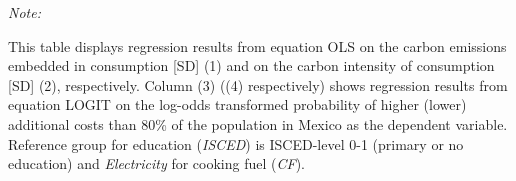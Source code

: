 \begin{table}[htbp!]
\begin{adjustbox}{width = 1\textwidth, max height = 0.95\textheight, center}
\begin{threeparttable}[b]
         \begin{tablenotes}\item \medskip \textit{Note:}
            \item This table displays regression results from equation OLS on the carbon emissions embedded in consumption [SD] (1) and on the carbon intensity of consumption [SD] (2), respectively. 
                                      Column (3) ((4) respectively) shows regression results from equation LOGIT on the log-odds transformed probability of higher (lower) additional costs than 80\% of the population in Mexico as the dependent variable. Reference group for education (\textit{ISCED}) is ISCED-level 0-1 (primary or no education) and \textit{Electricity} for cooking fuel (\textit{CF}).
         \end{tablenotes}
      \end{threeparttable}
   \end{adjustbox}
\end{table}


